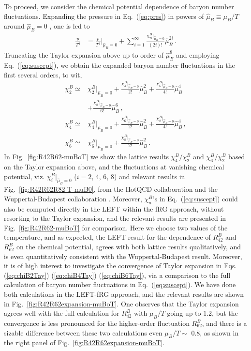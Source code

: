 \documentclass[%
reprint,
superscriptaddress,
showpacs,preprintnumbers,
 amsmath,amssymb,
 aps,
prd,
]{revtex4-1}
\def\Fig#1{Fig.~\ref{#1}} \def\Tab#1{Tab.~\ref{#1}}
\def\Eq#1{Eq.~(\ref{#1})}
\begin{document}
To proceed, we consider the chemical potential dependence of baryon number fluctuations. Expanding the pressure in \Eq{eq:pres} in powers of $\hat{\mu}_{B}\equiv\mu_B/T$ around $\hat{\mu}_{B}=0$ , one is led to 
%
\begin{align}
  \frac{p}{T^4}&=\frac{p}{T^4}\Big|_{\hat{\mu}_{B}=0}+\sum_{i=1}^{\infty}\frac{\chi^B_{2i}|_{\hat{\mu}_{B}=0}}{(2i)!}\hat{\mu}_{B}^{2i}\,.\label{eq:cmu}
\end{align}
%
Truncating the Taylor expansion above up to order of $\hat{\mu}_{B}^{8}$ and employing \Eq{eq:suscept}, we obtain the expanded baryon number fluctuations in the first several orders, to wit,
%
\begin{align}
\chi^B_2\simeq&\chi^B_2|_{\hat{\mu}_{B}=0}+\frac{\chi^B_4|_{\hat{\mu}_{B}=0}}{2!}\hat{\mu}_{B}^{2}+\frac{\chi^B_6|_{\hat{\mu}_{B}=0}}{4!}\hat{\mu}_{B}^{4}\nonumber\\[2ex]
&+\frac{\chi^B_8|_{\hat{\mu}_{B}=0}}{6!}\hat{\mu}_{B}^{6}\,,\label{eq:chiB2Tay}\\[2ex]
\chi^B_4\simeq&\chi^B_4|_{\hat{\mu}_{B}=0}+\frac{\chi^B_6|_{\hat{\mu}_{B}=0}}{2!}\hat{\mu}_{B}^{2}+\frac{\chi^B_8|_{\hat{\mu}_{B}=0}}{4!}\hat{\mu}_{B}^{4}\,,\label{eq:chiB4Tay}\\[2ex]
\chi^B_6\simeq&\chi^B_6|_{\hat{\mu}_{B}=0}+\frac{\chi^B_8|_{\hat{\mu}_{B}=0}}{2!}\hat{\mu}_{B}^{2}\,.\label{eq:chiB6Tay}
\end{align}
%
In \Fig{fig:R42R62-muBoT} we show the lattice results $\chi^B_4/\chi^B_2$ and $\chi^B_6/\chi^B_2$ based on the Taylor expansion above, and the fluctuations at vanishing chemical potential, viz. $\chi^B_{i}|_{\hat{\mu}_{B}=0}$ ($i=2$, 4, 6, 8) and relevant results in \Fig{fig:R42R62R82-T-muB0}, from the HotQCD collaboration \cite{Bazavov:2020bjn} and the Wuppertal-Budapest collaboration \cite{Borsanyi:2018grb}. Moreover, $\chi^B_n$'s in \Eq{eq:suscept} could also be computed directly in the LEFT within the fRG approach, without resorting to the Taylor expansion, and the relevant results are presented in \Fig{fig:R42R62-muBoT} for comparison. Here we choose two values of the temperature, and as expected, the LEFT result for the dependence of $R^{B}_{42}$ and $R^{B}_{62}$ on the chemical potential, agrees with both lattice results qualitatively, and is even quantitatively consistent with the Wuppertal-Budapest result. Moreover, it is of high interest to investigate the convergence of Taylor expansion in Eqs. (\ref{eq:chiB2Tay}) (\ref{eq:chiB4Tay}) (\ref{eq:chiB6Tay}), via a comparison to the full calculation of baryon number fluctuations in \Eq{eq:suscept}. We have done both calculations in the LEFT-fRG approach, and the relevant results are shown in \Fig{fig:R42R62expansion-muBoT}. One observes that the Taylor expansion agrees well with the full calculation for $R^{B}_{42}$ with $\mu_B/T$ going up to 1.2, but the convergence is less pronounced for the higher-order fluctuation $R^{B}_{62}$, and there is a sizable difference between these two calculations even $\mu_B/T \sim$ 0.8, as shown in the right panel of \Fig{fig:R42R62expansion-muBoT}.
\end{document}
